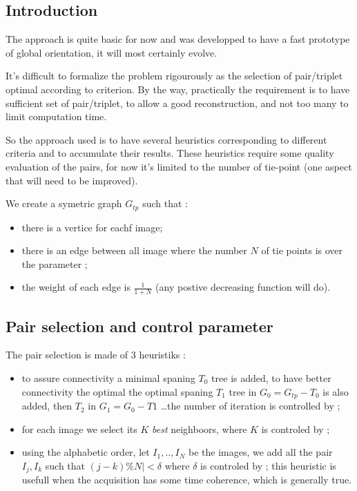 \documentclass[a4paper]{article}
\begin{document}
\subsection{Introduction}

The approach is quite basic for now and was developped to have a fast
prototype of global orientation, it will most certainly evolve.

It's difficult to formalize the problem rigourously as the selection
of pair/triplet  optimal according to criterion.  By the way, practically 
the requirement is to have sufficient set of pair/triplet, to allow
a good reconstruction, and not too many to limit computation time.

So the approach used is to have several heuristics corresponding to different criteria
and to accumulate their results.  These heuristics require some quality evaluation of the 
pairs, for now it's limited to the  number of tie-point (one aspect that will need to be improved).


We create a symetric graph $G_{tp}$ such that :

\begin{itemize}
   \item there is a vertice for eachf image;
   \item there is an edge between all image where the number $N$ of tie 
         points is over the parameter ;
    \item the weight of each edge is $\frac{1}{1+N}$ (any postive decreasing function will do).
\end{itemize}


\subsection{Pair selection and control parameter}

The pair selection is made of $3$ heuristiks :

\begin{itemize}
   \item  to assure connectivity a minimal spaning $T_0$ tree is added, 
          to have better connectivity the optimal the optimal spaning $T_1$ tree in $G_0=G_{tp}-T_0$ is also added,
          then $T_2$ in  $G_1=G_0-T1$ \dots the number of iteration is controlled by ;

   \item   for each image  we select its $K$  \emph{best} neighboors, where $K$ is controled
           by  ;

   \item   using the alphabetic order, let $I_1,..,I_N$  be the images, we add all the pair 
           $I_j,I_k$ such that $(j-k)\%N|<\delta$  where $\delta$ is controled by ;
           this heuristic is usefull when the acquisition has some time coherence, which is generally true.

\end{itemize}
\end{document}
